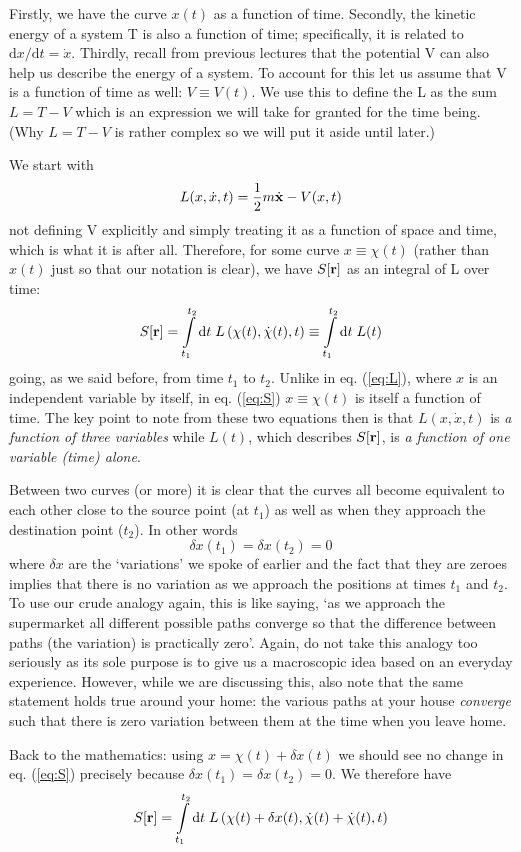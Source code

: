 \documentclass[english,seminar,headertitle]{lecture}
\begin{document}
Firstly, we have the curve $x(t)$ as a function of time. Secondly, the kinetic energy of a system T is also a function of time; specifically, it is related to $\textrm{d}x/\textrm{d}t = \dot{x}$. Thirdly, recall from previous lectures that the potential V can also help us describe the energy of a system. To account for this let us assume that V is a function of time as well: $V \equiv V(t)$. We use this to define the L as  the sum $L = T-V$ which is an expression we will take for granted for the time being. (Why $L=T-V$ is rather complex so we will put it aside until later.)

We start with
\begin{align}
L(x,\dot{x},t) = {1\over2}m\dot{\mathbf{x}} - V(x,t) \label{eq:L}
\end{align}
not defining V explicitly and simply treating it as a function of space and time, which is what it is after all. Therefore, for some curve $x \equiv \chi(t)$ (rather than $x(t)$ just so that our notation is clear), we have $S[\mathbf{r}]$ as an integral of L over time:
\begin{align}
S[\mathbf{r}] = \int\displaylimits_{t_1}^{t_2} \textrm{d}t\; L \left( \chi(t), \dot{\chi}(t), t \right) \equiv \int\displaylimits_{t_1}^{t_2} \textrm{d}t\; L(t) \label{eq:S}
\end{align}%
going, as we said before, from time $t_1$ to $t_2$. Unlike in eq. (\ref{eq:L}), where $x$ is an independent variable by itself, in eq. (\ref{eq:S}) $x\equiv\chi(t)$ is itself a function of time. The key point to note from these two equations then is that $L(x,\dot{x},t)$ is \textit{a function of three variables} while $L(t)$, which describes $S[\mathbf{r}]$, is \textit{a function of one variable (time) alone}.

Between two curves (or more) it is clear that the curves all become equivalent to each other close to the source point (at $t_1$) as well as when they approach the destination point ($t_2$). In other words $$\delta x(t_1) = \delta x(t_2) = 0$$where $\delta x$ are the `variations' we spoke of earlier and the fact that they are zeroes implies that there is no variation as we approach the positions at times $t_1$ and $t_2$. To use our crude analogy again, this is like saying, `as we approach the supermarket all different possible paths converge so that the difference between paths (the variation) is practically zero'. Again, do not take this analogy too seriously as its sole purpose is to give us a macroscopic idea based on an everyday experience. However, while we are discussing this, also note that the same statement holds true around your home: the various paths at your house \textit{converge} such that there is zero variation between them at the time when you leave home.

Back to the mathematics: using $x = \chi(t) + \delta x(t)$ we should see no change in eq. (\ref{eq:S}) precisely because $\delta x(t_1) = \delta x(t_2) = 0$. We therefore have
\begin{align*}
S[\mathbf{r}] = \int\displaylimits_{t_1}^{t_2} \textrm{d}t\; L \left( \chi(t) + \delta x(t), \dot{\chi}(t) + \dot{\chi}(t), t \right)
\end{align*}%
\end{document}
